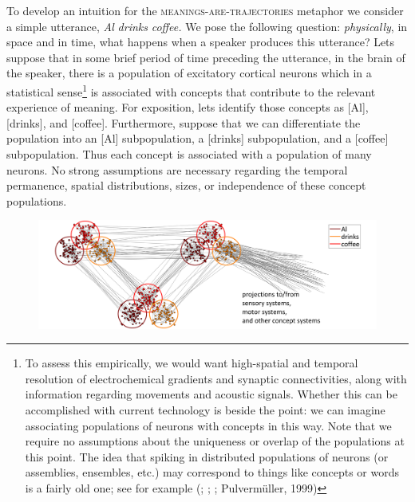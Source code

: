 To develop an intuition for the \textsc{meanings}\textsc{{}-are-}\textsc{trajectories} metaphor we consider a simple utterance, \textit{Al} \textit{drinks} \textit{coffee.} We pose the following question: \textit{physically}, in space and in time, what happens when a speaker produces this utterance? Lets suppose that in some brief period of time preceding the utterance, in the brain of the speaker, there is a population of excitatory cortical neurons which in a statistical sense\footnote{To assess this empirically, we would want high-spatial and temporal resolution of electrochemical gradients and synaptic connectivities, along with information regarding movements and acoustic signals. Whether this can be accomplished with current technology is beside the point: we can imagine associating populations of neurons with concepts in this way. Note that we require no assumptions about the uniqueness or overlap of the populations at this point. The idea that spiking in distributed populations of neurons (or assemblies, ensembles, etc.) may correspond to things like concepts or words is a fairly old one; see for example (\citealt{Abeles2012}; \citealt{Braitenberg1978}; \citealt{Hebb1949}; Pulvermüller, 1999)} is associated with concepts that contribute to the relevant experience of meaning. For exposition, lets identify those concepts as [Al], [drinks], and [coffee]. Furthermore, suppose that we can differentiate the population into an [Al] subpopulation, a [drinks] subpopulation, and a [coffee] subpopulation. Thus each concept is associated with a population of many neurons. No strong assumptions are necessary regarding the temporal permanence, spatial distributions, sizes, or independence of these concept populations.

  
\begin{figure}
\includegraphics[width=\textwidth]{figures/Tilsen-img9.png}
\caption{\missingcaption}
\label{fig:}
\end{figure}
 

